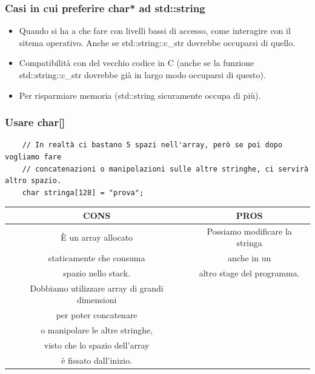 \subsubsection{Casi in cui preferire char* ad std::string}

\begin{itemize}
	\item \textsf{\small Quando si ha a che fare con livelli bassi di accesso, come interagire con il sitema operativo. Anche se std::string::c\_str dovrebbe occuparsi di quello.}
	\item \textsf{\small Compatibilità con del vecchio codice in C (anche se la funzione std::string::c\_str dovrebbe già in largo modo occuparsi di questo).}
	\item \textsf{\small Per risparmiare memoria (std::string sicuramente occupa di più).}
\end{itemize}

\subsubsection{Usare char[]}

\begin{lstlisting}
	// In realtà ci bastano 5 spazi nell'array, però se poi dopo vogliamo fare
	// concatenazioni o manipolazioni sulle altre stringhe, ci servirà altro spazio.
	char stringa[128] = "prova";
\end{lstlisting}

\begin{tabular}{|c|c|}
	\hline
	\color{red} CONS & \color{Green} PROS \\
	\hline
	\textsf{\small È un array allocato  } & \textsf{\small Possiamo modificare la stringa } \\
	\textsf{\small staticamente che consuma } & \textsf{\small anche in un } \\
	\textsf{\small spazio nello stack.} & \textsf{\small altro stage del programma.} \\
	\hline
	\textsf{\small Dobbiamo utilizzare array di grandi dimensioni  } & \textsf{\small } \\
	\textsf{\small per poter concatenare } & \textsf{\small } \\
	\textsf{\small o manipolare le altre stringhe,} & \textsf{\small } \\
	\textsf{\small visto che lo spazio dell'array } & \textsf{\small } \\
	\textsf{\small è fissato dall'inizio.} & \textsf{\small } \\
	\hline
\end{tabular}


